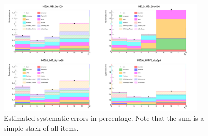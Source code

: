 \begin{figure}[b]
    \centering
    \includegraphics[width=0.925\textwidth]{plots/s3_SystErr_2to12.png}
    \caption{Estimated systematic errors in percentage. Note that the sum is a simple stack of all items.}
    \label{fig:s3_systErr}
\end{figure}

